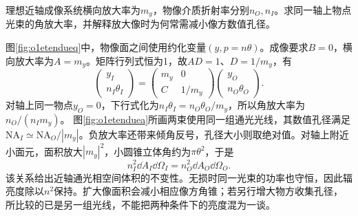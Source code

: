 \begin{exercise}\label{ex:o1etendue}
理想近轴成像系统横向放大率为$m_y$，物像介质折射率分别$n_O,n_I$。求同一轴上物点光束的角放大率，并解释放大像时为何常需减小像方数值孔径。
\end{exercise}
\begin{solution}
图\ref{fig:o1etendueq}中，物像面之间使用约化变量$(y,p=n\theta)$。成像要求$B=0$，横向放大率为$A=m_y$。矩阵行列式恒为1，故$AD=1$、$D=1/m_y$，有
\[
 \begin{pmatrix}y_I\\n_I\theta_I\end{pmatrix}
 =\begin{pmatrix}m_y&0\\ C&1/m_y\end{pmatrix}
 \begin{pmatrix}y_O\\n_O\theta_O\end{pmatrix}.
\]
对轴上同一物点$y_O=0$，下行式化为$n_I\theta_I=n_O\theta_O/m_y$，所以角放大率为$n_O/(n_Im_y)$。
图\ref{fig:o1etenduea}所画两束使用同一组通光光线，其数值孔径满足$\mathrm{NA}_I\simeq\mathrm{NA}_O/|m_y|$。负放大率还带来倾角反号，孔径大小则取绝对值。对轴上附近小面元，面积放大$|m_y|^2$，小圆锥立体角约为$\pi\theta^2$，于是
\[
 n_I^2\dd A_I\dd\Omega_I
 =n_O^2\dd A_O\dd\Omega_O.
\]
该关系给出近轴通光相空间体积的不变性。无损时同一光束的功率也守恒，因此辐亮度除以$n^2$保持。扩大像面积会减小相应像方角锥；若另行增大物方收集孔径，所比较的已是另一组光线，不能把两种条件下的亮度混为一谈。
\end{solution}
